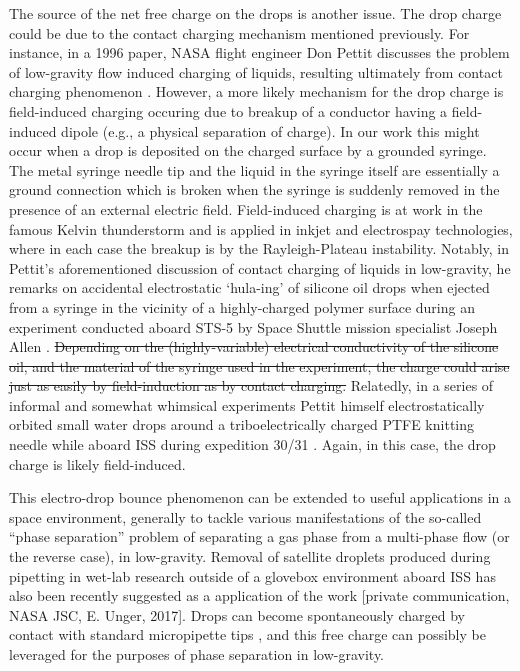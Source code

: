 \documentclass[aip,reprint, floatfix]{revtex4-1}
\begin{document}
The source of the net free charge on the drops is another issue. The drop charge could be due to the contact charging mechanism mentioned previously. For instance, in a 1996 paper, NASA flight engineer Don Pettit discusses the problem of low-gravity flow induced charging of liquids, resulting ultimately from contact charging phenomenon \cite{pettit_donald_flow_????}. However, a more likely mechanism for the drop charge is field-induced charging occuring due to breakup of a conductor having a field-induced dipole (e.g., a physical separation of charge). In our work this might occur when a drop is deposited on the charged surface by a grounded syringe. The metal syringe needle tip and the liquid in the syringe itself are essentially a ground connection which is broken when the syringe is suddenly removed in the presence of an external electric field. Field-induced charging is at work in the famous Kelvin thunderstorm and is applied in inkjet and electrospay technologies, where in each case the breakup is by the Rayleigh-Plateau instability. Notably, in Pettit's aforementioned discussion of contact charging of liquids in low-gravity, he remarks on accidental electrostatic `hula-ing' of silicone oil drops when ejected from a syringe in the vicinity of a highly-charged polymer surface during an experiment conducted aboard STS-5 by Space Shuttle mission specialist Joseph Allen \cite{pettit_donald_flow_????}. \sout{Depending on the (highly-variable) electrical conductivity of the silicone oil, and the material of the syringe used in the experiment, the charge could arise just as easily by field-induction as by contact charging.} Relatedly, in a series of informal and somewhat whimsical experiments Pettit himself electrostatically orbited small water drops around a triboelectrically charged PTFE knitting needle while aboard ISS during expedition 30/31 \cite{stevenson_electrostatic_2015}. Again, in this case, the drop charge is likely field-induced.

This electro-drop bounce phenomenon can be extended to useful applications in a space environment, generally to tackle various manifestations of the so-called ``phase separation'' problem of separating a gas phase from a multi-phase flow (or the reverse case), in low-gravity. Removal of satellite droplets produced during pipetting in wet-lab research outside of a glovebox environment aboard ISS has also been recently suggested as a application of the work [private communication, NASA JSC, E. Unger, 2017]. Drops can become spontaneously charged by contact with standard micropipette tips \citep{choi_spontaneous_2013}, and this free charge can possibly be leveraged for the purposes of phase separation in low-gravity.
\end{document}
